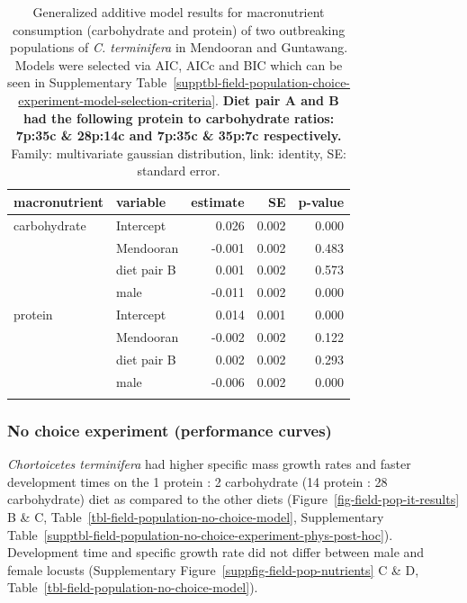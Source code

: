 \documentclass[
]{article}
\begin{document}
\begin{longtable}{llrrr}

\toprule
macronutrient & variable & estimate & SE & p-value \\ 
\midrule\addlinespace[2.5pt]
carbohydrate & Intercept & 0.026 & 0.002 & 0.000 \\ 
 & Mendooran & -0.001 & 0.002 & 0.483 \\ 
 & diet pair B & 0.001 & 0.002 & 0.573 \\ 
 & male & -0.011 & 0.002 & 0.000 \\ 
protein & Intercept & 0.014 & 0.001 & 0.000 \\ 
 & Mendooran & -0.002 & 0.002 & 0.122 \\ 
 & diet pair B & 0.002 & 0.002 & 0.293 \\ 
 & male & -0.006 & 0.002 & 0.000 \\ 
\bottomrule

\caption{\label{tbl-field-population-it-model}Generalized additive model
results for macronutrient consumption (carbohydrate and protein) of two
outbreaking populations of \emph{C. terminifera} in Mendooran and
Guntawang. Models were selected via AIC, AICc and BIC which can be seen
in
Supplementary Table~\ref{supptbl-field-population-choice-experiment-model-selection-criteria}.
\textbf{Diet pair A and B had the following protein to carbohydrate
ratios: 7p:35c \& 28p:14c and 7p:35c \& 35p:7c respectively.} Family:
multivariate gaussian distribution, link: identity, SE: standard error.}

\tabularnewline

\end{longtable}

\endgroup

\subsubsection{No choice experiment (performance
curves)}\label{no-choice-experiment-performance-curves}

\emph{Chortoicetes terminifera} had higher specific mass growth rates
and faster development times on the 1 protein : 2 carbohydrate (14
protein : 28 carbohydrate) diet as compared to the other diets
(Figure~\ref{fig-field-pop-it-results} B \& C,
Table~\ref{tbl-field-population-no-choice-model},
Supplementary Table~\ref{supptbl-field-population-no-choice-experiment-phys-post-hoc}).
Development time and specific growth rate did not differ between male
and female locusts
(Supplementary Figure~\ref{suppfig-field-pop-nutrients} C \& D,
Table~\ref{tbl-field-population-no-choice-model}).
\end{document}
